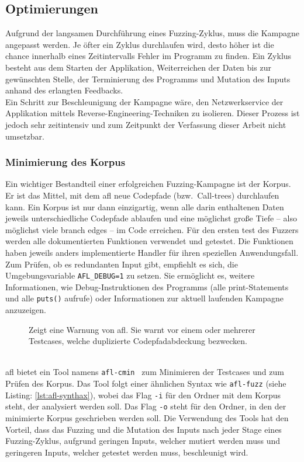 
\subsection{Optimierungen}\label{subsec: optimierung}
Aufgrund der langsamen Durchführung eines Fuzzing-Zyklus, muss die Kampagne angepasst werden.
Je öfter ein Zyklus durchlaufen wird, desto höher ist die chance innerhalb eines Zeitintervalls Fehler im Programm zu finden.
Ein Zyklus besteht aus dem Starten der Applikation, Weiterreichen der Daten bis zur gewünschten Stelle, der Terminierung
des Programms und Mutation des Inputs anhand des erlangten Feedbacks.\\
Ein Schritt zur Beschleunigung der Kampagne wäre, den Netzwerkservice der Applikation mittels Reverse-Engineering-Techniken
zu isolieren.
Dieser Prozess ist jedoch sehr zeitintensiv und zum Zeitpunkt der Verfassung dieser Arbeit nicht umsetzbar.
\subsubsection{Minimierung des Korpus}
Ein wichtiger Bestandteil einer erfolgreichen Fuzzing-Kampagne ist der Korpus.
Er ist das Mittel, mit dem \gls{afl} neue Codepfade (bzw.\ Call-trees) durchlaufen kann.
Ein Korpus ist nur dann einzigartig, wenn alle darin enthaltenen Daten jeweils unterschiedliche Codepfade ablaufen und eine möglichst
große Tiefe -- also möglichst viele branch edges -- im Code erreichen.
Für den ersten test des Fuzzers werden alle dokumentierten Funktionen verwendet und getestet.
Die Funktionen haben jeweils anders implementierte Handler für ihren speziellen Anwendungsfall.
Zum Prüfen, ob es redundanten Input gibt, empfiehlt es sich, die Umgebungsvariable \texttt{AFL\_DEBUG=1} zu setzen.
Sie ermöglicht es, weitere Informationen, wie Debug-Instruktionen des Programms (alle print-Statements und alle \texttt{puts()} aufrufe)
oder Informationen zur aktuell laufenden Kampagne anzuzeigen.
\begin{figure}[h]
    \caption{Zeigt eine Warnung von \gls{afl}.
    Sie warnt vor einem oder mehrerer Testcases, welche duplizierte Codepfadabdeckung
    bezwecken.}\label{fig:unique-corpus}
\end{figure}\\
\gls{afl} bietet ein Tool namens \texttt{afl-cmin}~\cite{afl-cmin} zum Minimieren der Testcases und zum Prüfen des Korpus.
Das Tool folgt einer ähnlichen Syntax wie \texttt{afl-fuzz} (siehe Listing: \ref{lst:afl-synthax}), wobei das Flag \texttt{-i} für den Ordner mit dem Korpus steht,
der analysiert werden soll.
Das Flag \texttt{-o} steht für den Ordner, in den der minimierte Korpus geschrieben werden soll.
Die Verwendung des Tools hat den Vorteil, dass das Fuzzing und die Mutation des Inputs nach jeder Stage eines Fuzzing-Zyklus,
aufgrund geringen Inputs, welcher mutiert werden muss und geringeren Inputs, welcher getestet werden muss, beschleunigt wird.
